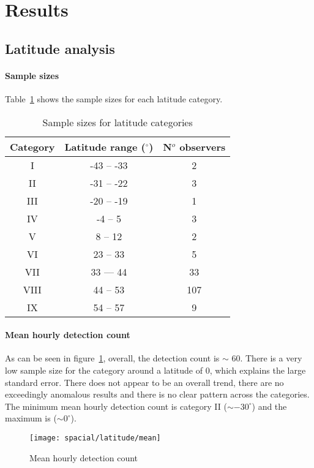\section{Results}

\subsection{Latitude analysis}
\paragraph{Sample sizes \\}
Table~\ref{tab:spac:lat} shows the sample sizes for each latitude category.
\begin{table}[h!]
	\centering
	\begin{tabular}{ccc}
		\hline 
		Category & Latitude range ($^{\circ}$) & N$^o$ observers \\ 
		\hline 
		I & -43 -- -33 & 2 \\
		II & -31 -- -22 & 3 \\
		III & -20 -- -19 & 1 \\
		IV & -4 -- 5 & 3 \\
		V & 8 -- 12 & 2 \\
		VI & 23 -- 33 & 5 \\
		VII & 33 --- 44 & 33 \\
		VIII & 44 -- 53 & 107\\
		IX & 54 -- 57 & 9 \\  
		\hline
	\end{tabular} 
	\caption{Sample sizes for latitude categories \label{tab:spac:lat}}
\end{table}

\paragraph{Mean hourly detection count\\}
As can be seen in figure~\ref{fig:spac:lat:mean}, overall, the detection count is $\sim$ 60. There is a very low sample size for the category around a latitude of 0, which explains the large standard error. There does not appear to be an overall trend, there are no exceedingly anomalous results and there is no clear pattern across the categories. The minimum mean hourly detection count is category II ($\sim -30^{\circ}$) and the maximum is ($\sim 0^{\circ}$).
\begin{figure}[h!]
	\centering
	\texttt{[image: spacial/latitude/mean]}
	\caption{Mean hourly detection count
		\label{fig:spac:lat:mean}}
\end{figure}
